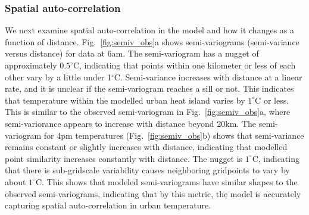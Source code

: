 \documentclass[draft,linenumbers]{agujournal}
\begin{document}
\subsubsection{Spatial auto-correlation}
We next examine spatial auto-correlation in the model and how it changes as a function of distance. Fig.~\ref{fig:semiv_obs}a shows semi-variograms (semi-variance versus distance) for data at 6am. The semi-variogram has a nugget of approximately $0.5^\circ$C, indicating that points within one kilometer or less of each other vary by a little under 1$^\circ$C. Semi-variance increases with distance at a linear rate, and it is unclear if the semi-variogram reaches a sill or not. This indicates that temperature within the modelled urban heat island varies by $1^\circ$C or less. This is similar to the observed semi-variogram in Fig.~\ref{fig:semiv_obs}a, where semi-variorance appears to increase with distance beyond 20km. The semi-variogram for 4pm temperatures (Fig.~\ref{fig:semiv_obs}b) shows that semi-variance remains constant or slightly increases with distance, indicating that modelled point similarity increases constantly with distance. The nugget is $1^\circ$C, indicating that there is sub-gridscale variability causes neighboring gridpoints to vary by about $1^\circ$C. 
This shows that modeled semi-variograms have similar shapes to the observed semi-variograms, indicating that by this metric, the model is accurately capturing spatial auto-correlation in urban temperature. %
\end{document}
